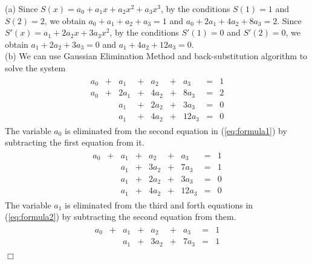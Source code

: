 \documentclass[UTF8,12pt,hyperref]{ctexart}
\newenvironment{solve}[1][\color{blue}\bf Solve]{\begin{trivlist}
\item[\hskip \labelsep {\color{blue}\bfseries
#1}]}{\hfill$\Box$\end{trivlist}}
\begin{document}
\begin{solve}
   (a) Since $S(x)=a_0+a_1x+a_2x^2+a_3x^3$, by the conditions $S(1)=1$ and $S(2)=2$, we obtain $a_0+a_1+a_2+a_3=1$ and $a_0+2a_1+4a_2+8a_3=2$.
      Since $S'(x)=a_1+2a_2x+3a_3x^2$, by the conditions $S'(1)=0$ and $S'(2)=0$, we obtain $a_1+2a_2+3a_3=0$ and $a_1+4a_2+12a_3=0$.\\
   (b) We can use Gaussian Elimination Method and back-substitution algorithm to solve the system
   \begin{equation}
      \begin{aligned}
         \begin{array}{rcrcrcrcr}
         a_0 & + & a_1   &+ & a_2 & +  & a_3 &=&1   \\
         a_0 & + & 2a_1 &+ & 4a_2& + & 8a_3 &=&2  \\
               &    & a_1 & + & 2a_2 &+  & 3a_3 &=&0  \\
               &    & a_1& +  & 4a_2 &+ & 12a_3 &=&0
         \end{array}
      \end{aligned}
      \label{eq:formula1}
   \end{equation}
   The variable $a_0$ is eliminated from the second equation in (\ref{eq:formula1}) by
   subtracting the first equation from it.
   \begin{equation}
      \begin{aligned}
      \begin{array}{rcrcrcrcr}
         a_0 & + & a_1   &+ & a_2 & +  & a_3 &=&1   \\
                 &    & a_1 &+ & 3a_2& + & 7a_3 &=&1  \\
                 &    & a_1 & + & 2a_2 &+  & 3a_3 &=&0  \\
                 &    & a_1& +  & 4a_2 &+ & 12a_3 &=&0
         \end{array}
      \end{aligned}
      \label{eq:formula2}
   \end{equation} 
   The variable $a_1$ is eliminated from the third and forth equations in (\ref{eq:formula2}) by 
   subtracting the second equation from them.
   \begin{equation}
      \begin{aligned}
      \begin{array}{rcrcrcrcr}
         a_0 & + & a_1   &+ & a_2 & +  & a_3 &=&1   \\
                 &    & a_1 &+ & 3a_2& + & 7a_3 &=&1  \\

\end{array}
\end{aligned}
\end{equation}
\end{solve}
\end{document}
